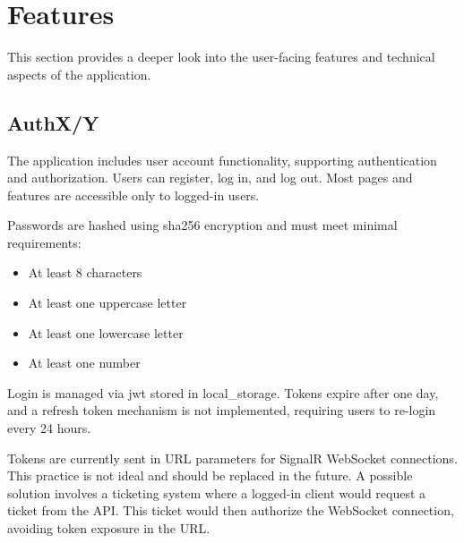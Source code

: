 








\section{Features}
This section provides a deeper look into the user-facing features and technical aspects of the application.

\subsection{AuthX/Y}
The application includes user account functionality, supporting authentication and authorization.
Users can register, log in, and log out. Most pages and features are accessible only to logged-in users.

Passwords are hashed using \gls{sha256} encryption and must meet minimal requirements:
\begin{itemize}
\item At least 8 characters
\item At least one uppercase letter
\item At least one lowercase letter
\item At least one number
\end{itemize}

Login is managed via \gls{jwt} stored in \gls{local_storage}.
Tokens expire after one day, and a refresh token mechanism is not implemented, requiring users to re-login every 24 hours.

Tokens are currently sent in URL parameters for SignalR WebSocket connections.
This practice is not ideal and should be replaced in the future.
A possible solution involves a ticketing system where a logged-in client would request a ticket from the API.
This ticket would then authorize the WebSocket connection, avoiding token exposure in the URL. %

